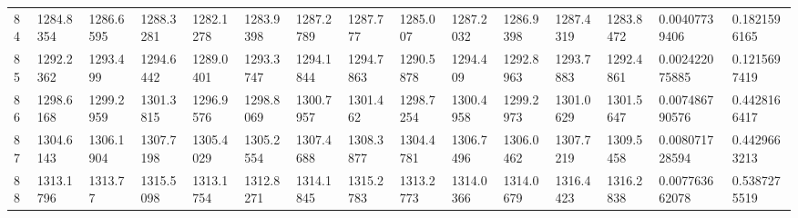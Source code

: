 \begin{landscape}
{\begin{longtable}{@{}lllllllllllllll@{}}
		84                                           & 1284.8354                & 1286.6595                & 1288.3281                & 1282.1278                & 1283.9398                & 1287.2789                & 1287.777                 & 1285.007                 & 1287.2032                & 1286.9398                & 1287.4319                & 1283.8472                & 0.00407739406                                                          & 0.1821596165                                    \\
		85                                           & 1292.2362                & 1293.499                 & 1294.6442                & 1289.0401                & 1293.3747                & 1294.1844                & 1294.7863                & 1290.5878                & 1294.409                 & 1292.8963                & 1293.7883                & 1292.4861                & 0.002422075885                                                         & 0.1215697419                                    \\
		86                                           & 1298.6168                & 1299.2959                & 1301.3815                & 1296.9576                & 1298.8069                & 1300.7957                & 1301.462                 & 1298.7254                & 1300.4958                & 1299.2973                & 1301.0629                & 1301.5647                & 0.007486790576                                                         & 0.4428166417                                    \\
		87                                           & 1304.6143                & 1306.1904                & 1307.7198                & 1305.4029                & 1305.2554                & 1307.4688                & 1308.3877                & 1304.4781                & 1306.7496                & 1306.0462                & 1307.7219                & 1309.5458                & 0.008071728594                                                         & 0.4429663213                                    \\
		88                                           & 1313.1796                & 1313.77                  & 1315.5098                & 1313.1754                & 1312.8271                & 1314.1845                & 1315.2783                & 1313.2773                & 1314.0366                & 1314.0679                & 1316.4423                & 1316.2838                & 0.007763662078                                                         & 0.5387275519                                    \\

\end{longtable}}
\end{landscape}
